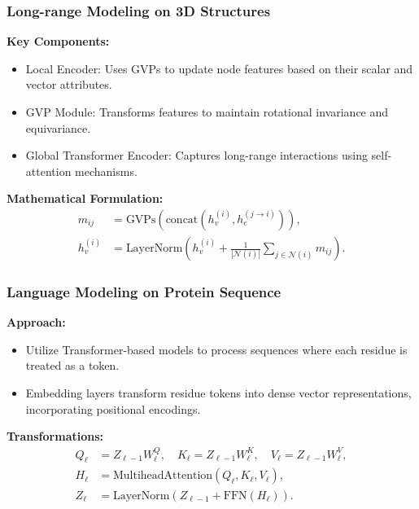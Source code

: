 \documentclass[11pt,xcolor={dvipsnames},hyperref={pdftex,pdfpagemode=UseNone,hidelinks,pdfdisplaydoctitle=true},usepdftitle=false]{beamer}
\begin{document}
\begin{frame}
\frametitle{Long-range Modeling on 3D Structures}
\textbf{Key Components:}
\begin{itemize}
    \item Local Encoder: Uses GVPs to update node features based on their scalar and vector attributes.
    \item GVP Module: Transforms features to maintain rotational invariance and equivariance.
    \item Global Transformer Encoder: Captures long-range interactions using self-attention mechanisms.
\end{itemize}

\textbf{Mathematical Formulation:}
\begin{align*}
    m_{ij} &= \text{GVPs}\left(\text{concat}(h_v^{(i)}, h_e^{(j \rightarrow i)})\right), \\
    h_v^{(i)} &= \text{LayerNorm}\left(h_v^{(i)} + \frac{1}{|\mathcal{N}(i)|}\sum_{j \in \mathcal{N}(i)} m_{ij}\right).
\end{align*}

\end{frame}

\begin{frame}
\frametitle{Language Modeling on Protein Sequence}
\textbf{Approach:}
\begin{itemize}
    \item Utilize Transformer-based models to process sequences where each residue is treated as a token.
    \item Embedding layers transform residue tokens into dense vector representations, incorporating positional encodings.
\end{itemize}

\textbf{Transformations:}
\begin{align*}
    Q_\ell &= Z_{\ell-1} W_\ell^Q, \quad K_\ell = Z_{\ell-1} W_\ell^K, \quad V_\ell = Z_{\ell-1} W_\ell^V, \\
    H_\ell &= \text{MultiheadAttention}(Q_\ell, K_\ell, V_\ell), \\
    Z_\ell &= \text{LayerNorm}(Z_{\ell-1} + \text{FFN}(H_\ell)).
\end{align*}

\end{frame}
\end{document}
